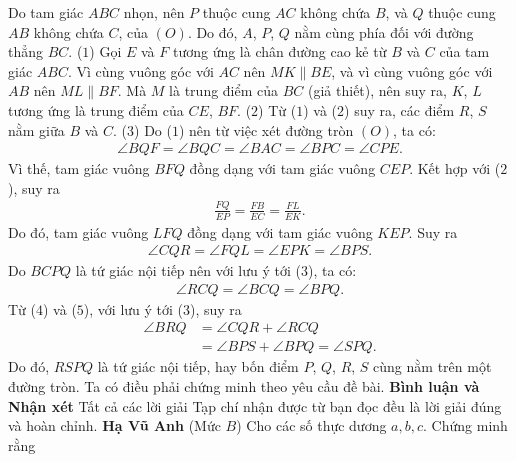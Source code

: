\begin{multicols}{2}
\begin{figure}[H]
		\vspace*{-5pt}
	\end{figure}
	Do tam giác $ABC$ nhọn, nên $P$ thuộc cung $AC$ không chứa $B$, và $Q$ thuộc cung $AB$ không chứa $C$, của $(O)$. Do đó, $A$, $P$, $Q$ nằm cùng phía đối với đường thẳng $BC$. \hfill ($1$)
	\vskip 0.05cm
	Gọi $E$ và $F$ tương ứng là chân đường cao kẻ từ $B$ và $C$ của tam giác $ABC$.
	\vskip 0.05cm
	Vì cùng vuông góc với $AC$ nên $MK \parallel BE$, và vì cùng vuông góc với $AB$ nên $ML \parallel BF$. Mà $M$ là trung điểm của $BC$ (giả thiết), nên suy ra, $K$, $L$ tương ứng là trung điểm của \linebreak$CE$, $BF$. \hfill ($2$)
	\vskip 0.05cm
	Từ ($1$) và ($2$) suy ra, các điểm $R$, $S$ nằm giữa $B$ và $C$. \hfill ($3$)
	\vskip 0.05cm
	Do ($1$) nên từ việc xét đường tròn $(O)$, ta có:
	\begin{align*}
		\angle BQF \!=\! \angle BQC \!=\! \angle BAC \!=\! \angle BPC\! =\! \angle CPE.
	\end{align*}
	Vì thế, tam giác vuông $BFQ$ đồng dạng với tam giác vuông $CEP$. Kết hợp với ($2$), suy ra
	\begin{align*}
		\frac{{FQ}}{{EP}} = \frac{{FB}}{{EC}} = \frac{{FL}}{{EK}}.
	\end{align*}
	Do đó, tam giác vuông $LFQ$ đồng dạng với tam giác vuông $KEP$. Suy ra
	\begin{align*}
		\angle CQR = \angle FQL = \angle EPK = \angle BPS. \tag{$4$}
	\end{align*}
	Do $BCPQ$ là tứ giác nội tiếp nên với lưu ý tới ($3$), ta có:
	\begin{align*}
		\angle RCQ = \angle BCQ = \angle BPQ. \tag{$5$}
	\end{align*}
	Từ ($4$) và ($5$), với lưu ý tới ($3$), suy ra
	\begin{align*}
		\angle BRQ &= \angle CQR + \angle RCQ \\
		&= \angle BPS + \angle BPQ = \angle SPQ.
	\end{align*}
	Do đó, $RSPQ$ là tứ giác nội tiếp, hay bốn điểm $P$, $Q$, $R$, $S$ cùng nằm trên một đường tròn.
	\vskip 0.05cm
	Ta có điều phải chứng minh theo yêu cầu đề bài.
	\vskip 0.05cm
	\textbf{\color{thachthuctoanhoc}Bình luận và Nhận xét}
	\vskip 0.05cm
	Tất cả các lời giải Tạp chí nhận được từ bạn đọc đều là lời giải đúng và hoàn chỉnh.
	\vskip 0.05cm
	\hfill \textbf{\color{thachthuctoanhoc}Hạ Vũ Anh}
	\vskip 0.05cm
	{}
	(Mức $B$) Cho các số thực dương $a,b,c$. Chứng minh rằng
	\begin{align*}

\end{align*}
\end{multicols}
